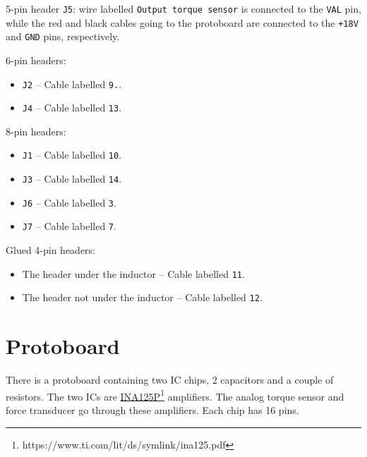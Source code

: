 5-pin header \verb|J5|: wire labelled \verb|Output torque sensor| is connected to the \verb|VAL| pin, while the red and black cables going to the protoboard are connected to the \verb|+18V| and \verb|GND| pins, respectively.

6-pin headers:
\begin{itemize}[noitemsep]
  \item \verb|J2| -- Cable labelled \verb|9.|.
  \item \verb|J4| -- Cable labelled \verb|13|.
\end{itemize}

8-pin headers:
\begin{itemize}[noitemsep]
  \item \verb|J1| -- Cable labelled \verb|10|.
  \item \verb|J3| -- Cable labelled \verb|14|.
  \item \verb|J6| -- Cable labelled \verb|3|.
  \item \verb|J7| -- Cable labelled \verb|7|.
\end{itemize}

Glued 4-pin headers:
\begin{itemize}[noitemsep]
  \item The header under the inductor -- Cable labelled \verb|11|.
  \item The header not under the inductor -- Cable labelled \verb|12|.
\end{itemize}

\section{Protoboard}
There is a protoboard containing two IC chips, 2 capacitors and a couple of resistors. The two ICs are \href{https://www.ti.com/lit/ds/symlink/ina125.pdf}{INA125P}\footnote{https://www.ti.com/lit/ds/symlink/ina125.pdf} amplifiers. The analog torque sensor and force transducer go through these amplifiers. Each chip has 16 pins.

